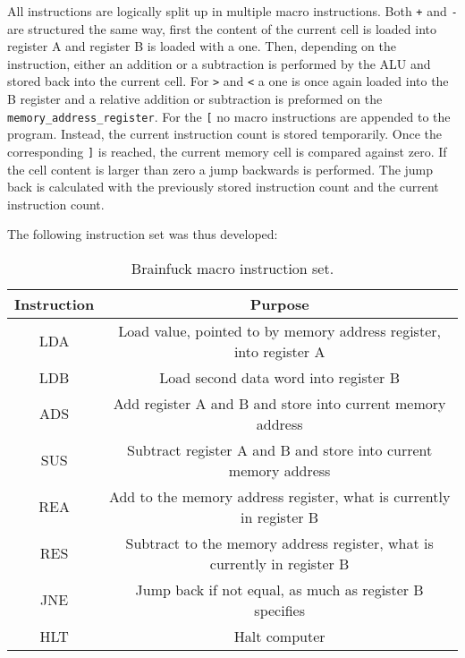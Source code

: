 All instructions are logically split up in multiple macro instructions. Both \texttt{+} and \texttt{-} are structured the same way, first the content of the current cell is loaded into register A and register B is loaded with a one. Then, depending on the instruction, either an addition or a subtraction is performed by the ALU and stored back into the current cell. For \texttt{\textgreater} and \texttt{\textless} a one is once again loaded into the B register and a relative addition or subtraction is preformed on the \texttt{memory\_address\_register}. For the \texttt{{[}} no macro instructions are appended to the program. Instead, the current instruction count is stored temporarily. Once the corresponding \texttt{{]}} is reached, the current memory cell is compared against zero. If the cell content is larger than zero a jump backwards is performed. The jump back is calculated with the previously stored instruction count and the current instruction count.

The following instruction set was thus developed:
\begin{table}[H]
    \begin{center}
    \begin{tabular}{cc}
    Instruction & Purpose                                                                  \\ \hline
    LDA         & Load value, pointed to by memory address register, into register A       \\
    LDB         & Load second data word into register B                                    \\
    ADS         & Add register A and B and store into current memory address               \\
    SUS         & Subtract register A and B and store into current memory address          \\
    REA         & Add to the memory address register, what is currently in register B      \\
    RES         & Subtract to the memory address register, what is currently in register B \\
    JNE         & Jump back if not equal, as much as register B specifies                  \\
    HLT         & Halt computer                                                           
    \end{tabular}
\end{center}
    \caption{Brainfuck macro instruction set.}
    \label{tab:brainfuck-macro-instructions}
    \end{table}

